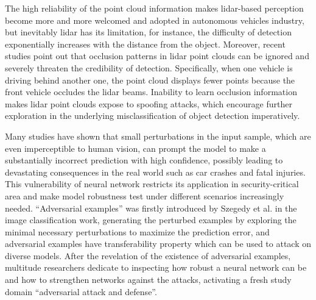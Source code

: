 The high reliability of the point cloud information makes \acrshort{lidar}-based perception become more and more welcomed and adopted in autonomous vehicles industry, but inevitably \acrshort{lidar} has its limitation, for instance, the difficulty of detection exponentially increases with the distance from the object. Moreover, recent studies point out that occlusion patterns in \acrshort{lidar} point clouds can be ignored and severely threaten the credibility of detection\cite{sun_towards_nodate}.  Specifically, when one vehicle is driving behind another one, the point cloud displays fewer points because the front vehicle occludes the \acrshort{lidar} beams. Inability to learn occlusion information makes \acrshort{lidar} point clouds expose to spoofing attacks, which encourage further exploration in the underlying misclassification of object detection imperatively.

Many studies have shown that small perturbations in the input sample, which are even imperceptible to human vision, can prompt the model to make a substantially incorrect prediction with high confidence\cite{papernot_limitations_2015,szegedy_intriguing_2014},\cite{goodfellow_explaining_2015} possibly leading to devastating consequences in the real world such as car crashes and fatal injuries\cite{kurakin_adversarial_2017,Uber}. This vulnerability of neural network restricts its application in security-critical area and make model robustness test under different scenarios increasingly needed. “Adversarial examples” was firstly introduced by Szegedy et al.\cite{szegedy_intriguing_2014} in the image classification work,  generating the perturbed examples by exploring the minimal necessary perturbations to maximize the prediction error, and adversarial examples have transferability property which can be used to attack on diverse models\cite{szegedy_intriguing_2014,goodfellow_explaining_2015,liu_delving_2017,papernot_transferability_2016,naseer_cross-domain_2019}. After the revelation of the existence of adversarial examples,  multitude researchers dedicate to inspecting how robust a neural network can be and how to strengthen networks against the attacks\cite{huang_learning_2016,gu_towards_2015,bastani_measuring_2017,shaham_understanding_2018}, activating a fresh study domain “adversarial attack and defense”.  


